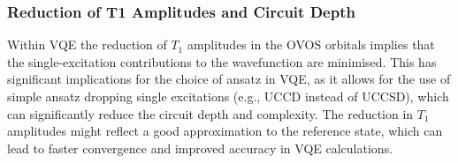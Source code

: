 \subsubsection{Reduction of T1 Amplitudes and Circuit Depth}

Within VQE the reduction of $T_1$ amplitudes in the OVOS orbitals implies that the single-excitation contributions to the wavefunction are minimised. This has significant implications for the choice of ansatz in VQE, as it allows for the use of simple ansatz dropping single excitations (e.g., UCCD instead of UCCSD), which can significantly reduce the circuit depth and complexity. The reduction in $T_1$ amplitudes might reflect a good approximation to the reference state, which can lead to faster convergence and improved accuracy in VQE calculations.




